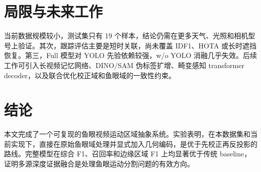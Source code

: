 \documentclass[10pt,twocolumn]{article}
\begin{document}
\section{{\cjkfont 局限与未来工作}}
{\cjkfont 当前数据规模较小，测试集只有} 19 {\cjkfont 个样本，结论仍需在更多天气、光照和相机型号上验证。其次，跟踪评估主要是短时关联，尚未覆盖} IDF1{\cjkfont 、}HOTA {\cjkfont 或长时遮挡恢复。第三，}Full {\cjkfont 模型对} YOLO {\cjkfont 先验依赖较强，}w/o YOLO {\cjkfont 消融几乎失效。后续工作可引入长视频记忆网络、}DINO/SAM {\cjkfont 伪标签扩增、畸变感知} transformer decoder{\cjkfont ，以及联合优化校正域和鱼眼域的一致性约束。}

\section{{\cjkfont 结论}}
{\cjkfont 本文完成了一个可复现的鱼眼视频运动区域抽象系统。实验表明，在本数据集和当前实现下，直接在原始鱼眼域处理并显式加入几何编码，是优于先校正再反投影的路线。完整模型在综合} F1{\cjkfont 、召回率和边缘区域} F1 {\cjkfont 上均显著优于传统} baseline{\cjkfont ，证明多源深度证据融合是处理鱼眼运动分割问题的有效方向。}



\end{document}
